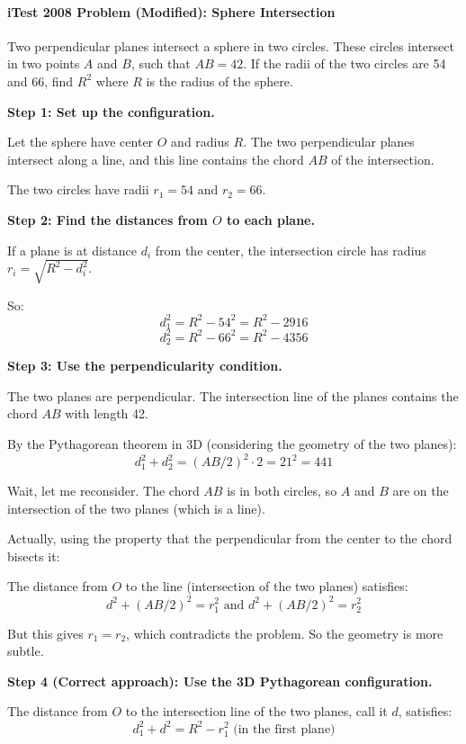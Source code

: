 ﻿\documentclass[12pt]{extarticle}
\begin{document}
\paragraph{iTest 2008 Problem (Modified): Sphere Intersection}

Two perpendicular planes intersect a sphere in two circles. These circles intersect in two points $A$ and $B$, such that $AB = 42$. If the radii of the two circles are 54 and 66, find $R^2$ where $R$ is the radius of the sphere.

\begin{solutionbox}
\textbf{Step 1: Set up the configuration.}

Let the sphere have center $O$ and radius $R$. The two perpendicular planes intersect along a line, and this line contains the chord $AB$ of the intersection.

The two circles have radii $r_1 = 54$ and $r_2 = 66$.

\textbf{Step 2: Find the distances from $O$ to each plane.}

If a plane is at distance $d_i$ from the center, the intersection circle has radius $r_i = \sqrt{R^2 - d_i^2}$.

So:
\[d_1^2 = R^2 - 54^2 = R^2 - 2916\]
\[d_2^2 = R^2 - 66^2 = R^2 - 4356\]

\textbf{Step 3: Use the perpendicularity condition.}

The two planes are perpendicular. The intersection line of the planes contains the chord $AB$ with length 42.

By the Pythagorean theorem in 3D (considering the geometry of the two planes):
\[d_1^2 + d_2^2 = (AB/2)^2 \cdot 2 = 21^2 = 441\]

Wait, let me reconsider. The chord $AB$ is in both circles, so $A$ and $B$ are on the intersection of the two planes (which is a line).

Actually, using the property that the perpendicular from the center to the chord bisects it:

The distance from $O$ to the line (intersection of the two planes) satisfies:
\[d^2 + (AB/2)^2 = r_1^2 \text{ and } d^2 + (AB/2)^2 = r_2^2\]

But this gives $r_1 = r_2$, which contradicts the problem. So the geometry is more subtle.

\textbf{Step 4 (Correct approach): Use the 3D Pythagorean configuration.}

The distance from $O$ to the intersection line of the two planes, call it $d$, satisfies:
\[d_1^2 + d^2 = R^2 - r_1^2 \text{ (in the first plane)}\]


\end{solutionbox}
\end{document}
